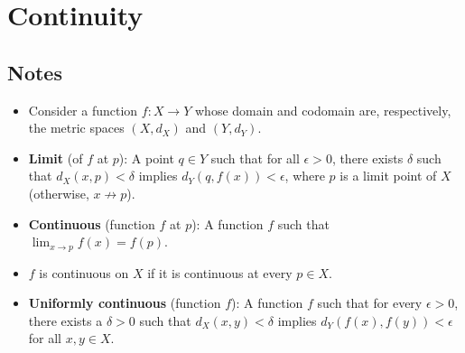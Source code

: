 \documentclass[../../notes.tex]{subfiles}
\begin{document}
\chapter{Continuity}
\section{Notes}
\begin{itemize}
    \item {}Consider a function $f:X\to Y$ whose domain and codomain are, respectively, the metric spaces $(X,d_X)$ and $(Y,d_Y)$.
    \item \textbf{Limit} (of $f$ at $p$): A point $q\in Y$ such that for all $\epsilon>0$, there exists $\delta$ such that $d_X(x,p)<\delta$ implies $d_Y(q,f(x))<\epsilon$, where $p$ is a limit point of $X$ (otherwise, $x\not\to p$).
    \item \textbf{Continuous} (function $f$ at $p$): A function $f$ such that $\lim_{x\to p}f(x)=f(p)$.
    \item $f$ is continuous on $X$ if it is continuous at every $p\in X$.
    \item \textbf{Uniformly continuous} (function $f$): A function $f$ such that for every $\epsilon>0$, there exists a $\delta>0$ such that $d_X(x,y)<\delta$ implies $d_Y(f(x),f(y))<\epsilon$ for all $x,y\in X$.
\end{itemize}
\end{document}
